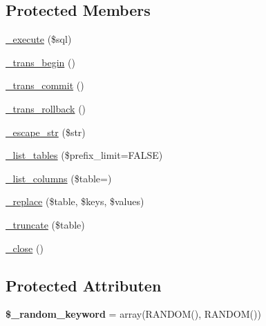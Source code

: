 \subsection*{Protected Members}
\begin{DoxyCompactItemize}
\item 
\mbox{\hyperlink{class_c_i___d_b__sqlite__driver_a114ab675d89bf8324a41785fb475e86d}{\+\_\+execute}} (\$sql)
\item 
\mbox{\hyperlink{class_c_i___d_b__sqlite__driver_ac81ac882c1d54347d810199a15856aac}{\+\_\+trans\+\_\+begin}} ()
\item 
\mbox{\hyperlink{class_c_i___d_b__sqlite__driver_a6fe7f373e0b11cfae23a5f41c0b35dda}{\+\_\+trans\+\_\+commit}} ()
\item 
\mbox{\hyperlink{class_c_i___d_b__sqlite__driver_ad49a116b0776c26b53114c9093fd102a}{\+\_\+trans\+\_\+rollback}} ()
\item 
\mbox{\hyperlink{class_c_i___d_b__sqlite__driver_af8ef0237bfcdb19215b63fff769e7a55}{\+\_\+escape\+\_\+str}} (\$str)
\item 
\mbox{\hyperlink{class_c_i___d_b__sqlite__driver_a435c0f3ce54fe7daa178baa8532ebd54}{\+\_\+list\+\_\+tables}} (\$prefix\+\_\+limit=F\+A\+L\+SE)
\item 
\mbox{\hyperlink{class_c_i___d_b__sqlite__driver_a7ccb7f9c301fe7f0a9db701254142b63}{\+\_\+list\+\_\+columns}} (\$table=\textquotesingle{}\textquotesingle{})
\item 
\mbox{\hyperlink{class_c_i___d_b__sqlite__driver_ae0adf73984daf2d42ad29b66c484c82b}{\+\_\+replace}} (\$table, \$keys, \$values)
\item 
\mbox{\hyperlink{class_c_i___d_b__sqlite__driver_aa029600528fc1ce660a23ff4b4667f95}{\+\_\+truncate}} (\$table)
\item 
\mbox{\hyperlink{class_c_i___d_b__sqlite__driver_a4d9082658000e5ede8312067c6dda9db}{\+\_\+close}} ()
\end{DoxyCompactItemize}
\subsection*{Protected Attributen}
\begin{DoxyCompactItemize}
\item 
\mbox{\label{class_c_i___d_b__sqlite__driver_a10213aa6e05f6d924d3277bb1d2fea00}} 
{\bfseries \$\+\_\+random\+\_\+keyword} = array(\textquotesingle{}R\+A\+N\+D\+OM()\textquotesingle{}, \textquotesingle{}R\+A\+N\+D\+OM()\textquotesingle{})
\end{DoxyCompactItemize}


